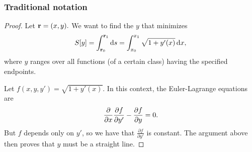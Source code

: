 \subsubsection{Traditional notation}
\begin{proof}
  Let $\mathbf{r} = (x, y). $ We want to find the $y$ that minimizes
\begin{align*}
  S[y] = \int_{\r_0}^{\r_1}\ds = \int_{x_0}^{x_1}\sqrt{1 + y'(x)} \dx,
\end{align*}
where $y$ ranges over all functions (of a certain class) having the specified endpoints.

Let $f(x, y, y') = \sqrt{1 + y'(x)}$. In this context, the Euler-Lagrange equations are
\begin{align*}
  \frac{\partial}{\partial x} \frac{\partial f}{\partial y'} - \frac{\partial f}{\partial y} = 0.
\end{align*}
But $f$ depends only on $y'$, so we have that $\frac{\partial f}{\partial y'} $ is constant. The argument above then
proves that $y$ must be a straight line.
\end{proof}


